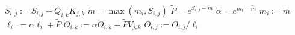 \documentclass{standalone}
\begin{document}
\begin{varwidth}{\linewidth}

  \begin{algorithmic}
  \ForAll{$i,j \in [0,N) \times [0,N)$}
    \For {$k \in [0,d)$}
      \State $S_{i,j} := S_{i,j} + Q_{i,k} K_{j,k}$
    \EndFor
  \EndFor
  \ForAll{$i \in [0,N)$}
    \For {$j \in [0,N)$}
      \State $\tilde{m} = \max(m_{i}, S_{i,j})$
      \State $\tilde{P} = e^{S_{i,j} - \tilde{m}}$
      \State $\tilde{\alpha} = e^{m_i - \tilde{m}} $
      \State $m_i := \tilde{m}$
      \State $\ell_i := \alpha \ell_i + \tilde{P}$
      \ForAll {$k \in [0,d)$}
        \State $O_{i,k} := \alpha O_{i,k} + \tilde{P} V_{j,k}$
      \EndFor
    \EndFor
  \EndFor
  \ForAll{$i,j \in [0,N) \times [0,d)$}
    \State $O_{i,j} := O_{i,j} / \ell_i$
  \EndFor
\end{algorithmic}

\end{varwidth}
\end{document}
